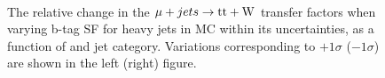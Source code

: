 \begin{figure}[!h]
  \centering
   ~~
  \\

  \caption{\label{fig:tfSyst_bsf_muToTtw} The relative change in the $\mj \rightarrow \mathrm{tt+W}$ transfer
  factors when varying b-tag SF for heavy jets in MC within its uncertainties, as a function of \scalht and jet category. 
  Variations corresponding to $+1\sigma$ ($-1\sigma$) are shown in the left (right) figure. 
  }
\end{figure}

